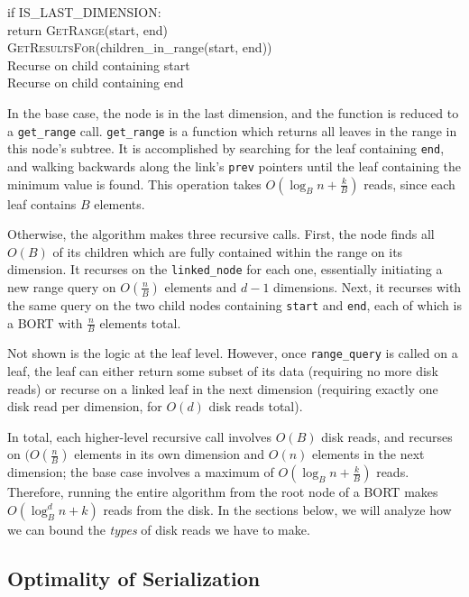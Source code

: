 \documentclass[11pt, oneside]{article}
\newcommand{\ms}{\texttt}
\begin{document}
    if IS\_LAST\_DIMENSION: \\
        return \textsc{GetRange}(start, end) \\

    \textsc{GetResultsFor}(children\_in\_range(start, end)) \\

    Recurse on child containing start \\
    Recurse on child containing end

In the base case, the node is in the last dimension, and the function is reduced
to a \ms{get\_range} call. \ms{get\_range} is a function which returns all
leaves in the range in this node's subtree. It is accomplished by searching for
the leaf containing \ms{end}, and walking backwards along the link's \ms{prev}
pointers until the leaf containing the minimum value is found. This operation
takes $O(\log_B n + \frac{k}{B})$ reads, since each leaf contains $B$ elements.

Otherwise, the algorithm makes three recursive calls. First, the node finds all
$O(B)$ of its children which are fully contained within the range on its
dimension. It recurses on the \ms{linked\_node} for each one, essentially
initiating a new range query on $O(\frac{n}{B})$ elements and $d - 1$
dimensions. Next, it recurses with the same query on the two child nodes
containing \ms{start} and \ms{end}, each of which is a BORT with $\frac{n}{B}$
elements total.

Not shown is the logic at the leaf level. However, once \ms{range\_query} is
called on a leaf, the leaf can either return some subset of its data (requiring
no more disk reads) or recurse on a linked leaf in the next dimension (requiring
exactly one disk read per dimension, for $O(d)$ disk reads total).

In total, each higher-level recursive call involves $O(B)$ disk reads, and
recurses on $(O(\frac{n}{B})$ elements in its own dimension and $O(n)$ elements
in the next dimension; the base case involves a maximum of $O(\log_B n +
\frac{k}{B})$ reads. Therefore, running the entire algorithm from the root node
of a BORT makes $O(\log_B^d n + k)$ reads from the disk. In the sections below,
we will analyze how we can bound the \textit{types} of disk reads we have to
make.

\subsection{Optimality of Serialization}
\end{document}
